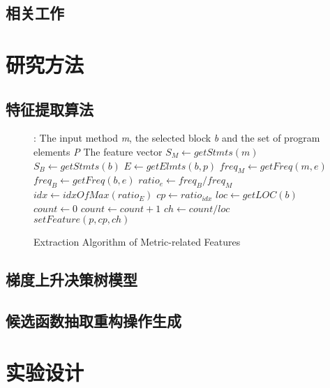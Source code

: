 \subsection{相关工作}
\section{研究方法}
\subsection{特征提取算法}

\begin{figure}[bth]
  {\scriptsize
	\begin{center}
	  \begin{algorithmic} [1]
			\REQUIRE  : The input method \textit{m}, the selected block
			\textit{b} and the set of program elements \textit{P}
			\ENSURE The feature vector %
			\STATE $S_M  \leftarrow getStmts(m)$
			\STATE $S_B  \leftarrow getStmts(b)$
				\STATE $E \leftarrow getElmts(b, p)$
					\STATE $freq_M \leftarrow getFreq(m, e)$
					\STATE $freq_B \leftarrow getFreq(b, e)$
					\STATE $ratio_e \leftarrow freq_B / freq_M$
				\ENDFOR
				\STATE $idx \leftarrow \textit{idxOfMax}(ratio_E)$
				\STATE $cp \leftarrow ratio_{idx}$
				\STATE $loc \leftarrow getLOC(b)$				
				\STATE $count \leftarrow 0$				
						\STATE $count \leftarrow count + 1$
					\ENDIF
				\ENDFOR
				\STATE $ch \leftarrow count / loc$ 
				\STATE $setFeature(p, cp, ch)$
			        \ENDFOR
		\end{algorithmic}
	\end{center}
        }
	\caption{Extraction Algorithm of Metric-related Features}
	\label{feature_algorithm}
\end{figure}
\subsection{梯度上升决策树模型}
\subsection{候选函数抽取重构操作生成}
\section{实验设计}
